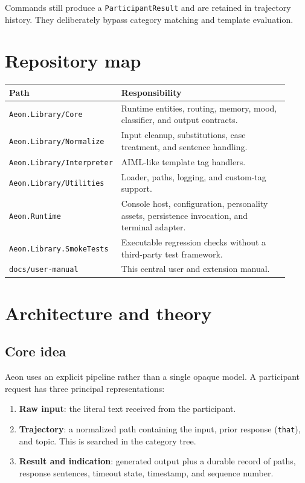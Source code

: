 \documentclass[11pt,a4paper]{article}
\begin{document}
Commands still produce a \texttt{ParticipantResult} and are retained in trajectory history. They deliberately bypass category matching and template evaluation.

\section{Repository map}

\begin{longtable}{p{0.30\linewidth}p{0.62\linewidth}}
\toprule
Path & Responsibility \\
\midrule
\endhead
\texttt{Aeon.Library/Core} & Runtime entities, routing, memory, mood, classifier, and output contracts. \\
\texttt{Aeon.Library/Normalize} & Input cleanup, substitutions, case treatment, and sentence handling. \\
\texttt{Aeon.Library/Interpreter} & AIML-like template tag handlers. \\
\texttt{Aeon.Library/Utilities} & Loader, paths, logging, and custom-tag support. \\
\texttt{Aeon.Runtime} & Console host, configuration, personality assets, persistence invocation, and terminal adapter. \\
\texttt{Aeon.Library.SmokeTests} & Executable regression checks without a third-party test framework. \\
\texttt{docs/user-manual} & This central user and extension manual. \\
\bottomrule
\end{longtable}

\section{Architecture and theory}

\subsection{Core idea}

Aeon uses an explicit pipeline rather than a single opaque model. A participant request has three principal representations:

\begin{enumerate}[label=\arabic*.]
  \item \textbf{Raw input}: the literal text received from the participant.
  \item \textbf{Trajectory}: a normalized path containing the input, prior response (\texttt{that}), and topic. This is searched in the category tree.
  \item \textbf{Result and indication}: generated output plus a durable record of paths, response sentences, timeout state, timestamp, and sequence number.
\end{enumerate}
\end{document}
